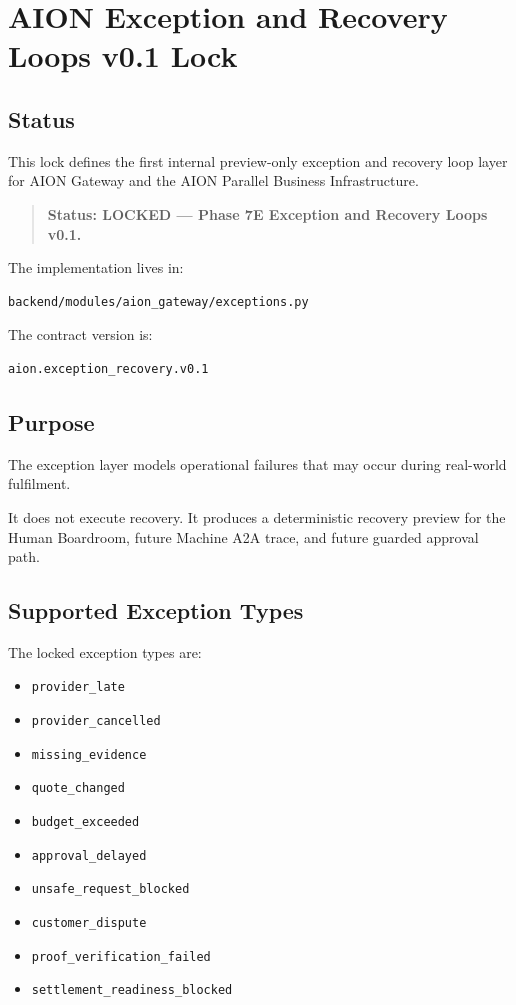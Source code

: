 \section{AION Exception and Recovery Loops v0.1 Lock}
\label{sec:aion-exception-recovery-loops-lock}

\subsection{Status}

This lock defines the first internal preview-only exception and recovery loop layer for AION Gateway and the AION Parallel Business Infrastructure.

\begin{quote}
\textbf{Status: LOCKED --- Phase 7E Exception and Recovery Loops v0.1.}
\end{quote}

The implementation lives in:

\begin{verbatim}
backend/modules/aion_gateway/exceptions.py
\end{verbatim}

The contract version is:

\begin{verbatim}
aion.exception_recovery.v0.1
\end{verbatim}

\subsection{Purpose}

The exception layer models operational failures that may occur during real-world fulfilment.

It does not execute recovery. It produces a deterministic recovery preview for the Human Boardroom, future Machine A2A trace, and future guarded approval path.

\subsection{Supported Exception Types}

The locked exception types are:

\begin{itemize}
  \item \texttt{provider\_late}
  \item \texttt{provider\_cancelled}
  \item \texttt{missing\_evidence}
  \item \texttt{quote\_changed}
  \item \texttt{budget\_exceeded}
  \item \texttt{approval\_delayed}
  \item \texttt{unsafe\_request\_blocked}
  \item \texttt{customer\_dispute}
  \item \texttt{proof\_verification\_failed}
  \item \texttt{settlement\_readiness\_blocked}
\end{itemize}

